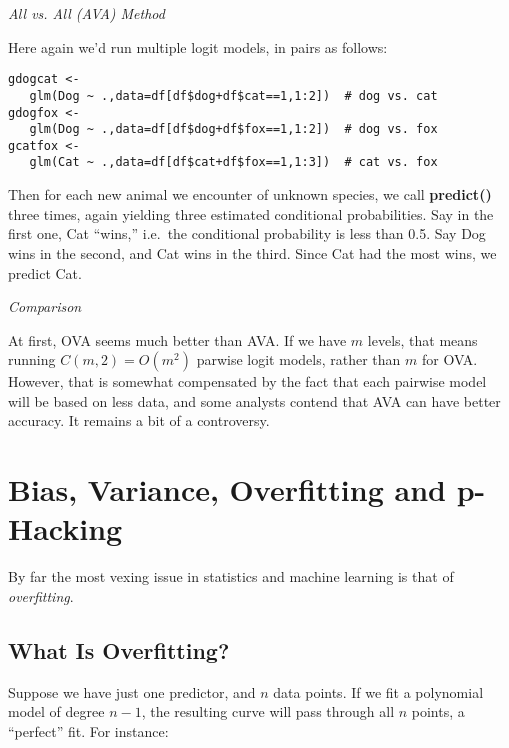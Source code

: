 \textit{All vs. All (AVA) Method}

Here again we'd run multiple logit models, in pairs as follows:

\begin{lstlisting}
gdogcat <- 
   glm(Dog ~ .,data=df[df$dog+df$cat==1,1:2])  # dog vs. cat
gdogfox <- 
   glm(Dog ~ .,data=df[df$dog+df$fox==1,1:2])  # dog vs. fox
gcatfox <- 
   glm(Cat ~ .,data=df[df$cat+df$fox==1,1:3])  # cat vs. fox
\end{lstlisting}

Then for each new animal we encounter of unknown species, we call
\textbf{predict()} three times, again yielding three estimated
conditional probabilities.  Say in the first one, Cat ``wins,'' i.e.\
the conditional probability is less than 0.5.  Say Dog wins in the
second, and Cat wins in the third.  Since Cat had the most wins, we
predict Cat.

\textit{Comparison}

At first, OVA seems much better than AVA.  If we have $m$ levels, that
means running $C(m,2) = O(m^2)$ parwise logit models, rather than $m$
for OVA.  However, that is somewhat compensated by the fact that each
pairwise model will be based on less data, and some analysts contend
that AVA can have better accuracy.  It remains a bit of a controversy.

\section{Bias, Variance, Overfitting and p-Hacking}
\label{overfit}

By far the most vexing issue in statistics and machine learning is that
of \textit{overfitting}.  

\subsection{What Is Overfitting?}

Suppose we have just one predictor, and $n$ data points.  If we fit a
polynomial model of degree $n-1$, the resulting curve will pass through
all $n$ points, a ``perfect'' fit.  For instance:

